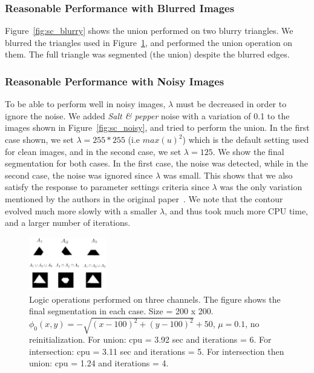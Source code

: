 \documentclass[10pt,twocolumn,letterpaper]{article}
\begin{document}
\subsubsection*{Reasonable Performance with Blurred Images}

Figure~\ref{fig:sc_blurry} shows the union performed on two blurry triangles. We blurred the triangles used in Figure~\ref{fig:threech}, and performed the
union operation on them. The full triangle was segmented (the union) despite the blurred edges.


\subsubsection*{Reasonable Performance with Noisy Images}

To be able to perform well in noisy images, $\lambda$ must be decreased in order to ignore the noise. We added \textit{Salt \& pepper} noise with a variation of
0.1 to
the images shown in Figure~\ref{fig:sc_noisy}, and tried to perform the union. In the first case shown, we set $\lambda = 255*255$ (i.e $ max(u)^2$) which is
the default setting
used for clean images, and in the second case, we set $\lambda = 125$. We show the final segmentation for both cases. In the first case, the noise was detected,
while in the second case, the noise was ignored since $\lambda$ was small. This shows that we also satisfy the response to parameter settings criteria since
$\lambda$ was the only variation mentioned by the authors in the original paper~\cite{sandberg2005logic}. We note that the contour evolved much more slowly
with a smaller $\lambda$, and thus took much more CPU time, and a larger number of iterations.

\begin{figure}[t!]
\centering
\includegraphics[width=0.3\textwidth]{threech.png}
\caption{Logic operations performed on three channels. The figure shows the final segmentation in each case. Size = 200 x 200. $\phi_{0}(x,y) = - \sqrt{(x -
100)^2 + (y - 100)^2} + 50$, $\mu = 0.1$, no reinitialization. For union: cpu = 3.92 sec and iterations = 6. For intersection: cpu = 3.11 sec and iterations =
5. For intersection then union: cpu = 1.24 and iterations = 4.}
\label{fig:threech}
\end{figure}
\end{document}
